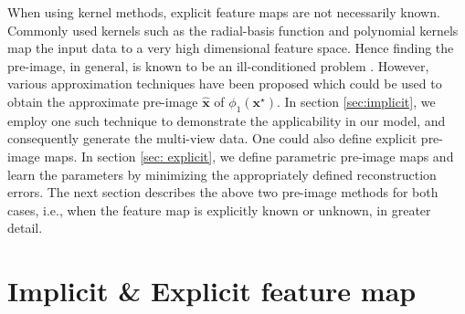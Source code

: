 \documentclass[preview,border=0.3pt]{standalone}
\begin{document}
When using kernel methods, explicit feature maps are not necessarily known. Commonly used kernels such as the radial-basis function and polynomial kernels map the input data to a very high dimensional feature space. Hence finding the pre-image, in general, is known to be an ill-conditioned problem \cite{mika_kernel_nodate}. However, various approximation techniques have been proposed \cite{bui_projection-free_2019,kwok_pre-image_2004-2,honeine_preimage_2011-1,weston_learning_2004} which could be used to obtain the approximate pre-image $\hat{\bm{x}}$ of ${\phi}_{1}(\bm{x}^{\star})$. In section \ref{sec:implicit}, we employ one such technique to demonstrate the applicability in our model, and consequently generate the multi-view data. One could also define explicit pre-image maps. In section \ref{sec: explicit}, we define parametric pre-image maps and learn the parameters by minimizing the appropriately defined reconstruction errors. The next section describes the above two pre-image methods for both cases, i.e., when the feature map is explicitly known or unknown, in greater detail.
%
% 
\section{Implicit \& Explicit feature map \label{sec:featuremaps}}
\end{document}
